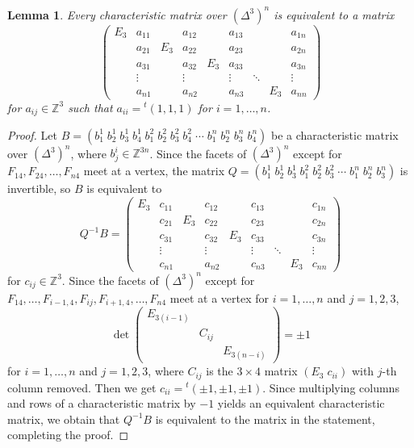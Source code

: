 \documentclass[a4paper]{amsart}
\numberwithin{equation}{section}
\newtheorem{lemma}[theorem]{Lemma}
\theoremstyle{definition}
\theoremstyle{remark}
\numberwithin{equation}{section}
\newcommand{\Z}{\mathbb{Z}}
\begin{document}
\begin{lemma}
  \label{standard form}
  Every characteristic matrix over $(\Delta^3)^n$ is equivalent to a matrix
  \[
    \begin{pmatrix}
      E_3&a_{11}&&a_{12}&&a_{13}&&&a_{1n}\\
      &a_{21}&E_3&a_{22}&&a_{23}&&&a_{2n}\\
      &a_{31}&&a_{32}&E_3&a_{33}&&&a_{3n}\\
      &\vdots&&\vdots&&\vdots&\ddots&&\vdots\\
      &a_{n1}&&a_{n2}&&a_{n3}&&E_3&a_{nn}
    \end{pmatrix}
  \]
  for $a_{ij}\in\Z^3$ such that $a_{ii}={}^t(1,1,1)$ for $i=1,\ldots,n$.
\end{lemma}

\begin{proof}
  Let $B=(b_1^1\;b_2^1\;b_3^1\;b_4^1\;b_1^2\;b_2^2\;b_3^2\;b_4^2\;\cdots\;b_1^n\;b_2^n\;b_3^n\;b_4^n)$ be a characteristic matrix over $(\Delta^3)^n$, where $b_j^i\in\Z^{3n}$. Since the facets of $(\Delta^3)^n$ except for $F_{14},F_{24},\ldots,F_{n4}$ meet at a vertex, the matrix $Q=(b_1^1\;b_2^1\;b_3^1\;b_1^2\;b_2^2\;b_3^2\;\cdots\;b_1^n\;b_2^n\;b_3^n)$ is invertible, so $B$ is equivalent to
  \[
    Q^{-1}B=
    \begin{pmatrix}
      E_3&c_{11}&&c_{12}&&c_{13}&&&c_{1n}\\
      &c_{21}&E_3&c_{22}&&c_{23}&&&c_{2n}\\
      &c_{31}&&c_{32}&E_3&c_{33}&&&c_{3n}\\
      &\vdots&&\vdots&&\vdots&\ddots&&\vdots\\
      &c_{n1}&&a_{n2}&&c_{n3}&&E_3&c_{nn}
    \end{pmatrix}
  \]
  for $c_{ij}\in\Z^3$. Since the facets of $(\Delta^3)^n$ except for $F_{14},\ldots,F_{i-1,4},F_{ij},F_{i+1,4},\ldots,F_{n4}$ meet at a vertex for $i=1,\ldots,n$ and $j=1,2,3$,
  \[
    \det
    \begin{pmatrix}
      E_{3(i-1)}\\
      &C_{ij}\\
      &&E_{3(n-i)}
    \end{pmatrix}
    =\pm 1
  \]
  for $i=1,\ldots,n$ and $j=1,2,3$, where $C_{ij}$ is the $3\times 4$ matrix $(E_3\;c_{ii})$ with $j$-th column removed. Then we get $c_{ii}={}^t(\pm 1,\pm 1,\pm 1)$. Since multiplying columns and rows of a characteristic matrix by $-1$ yields an equivalent characteristic matrix, we obtain that $Q^{-1}B$ is equivalent to the matrix in the statement, completing the proof.
\end{proof}
\end{document}
